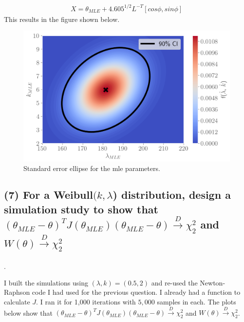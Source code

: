 \documentclass[11pt]{article}
\begin{document}
\begin{align*}
    X = \theta_{MLE} + 4.605^{1/2} L^{-T} [cos \phi, sin\phi]
\end{align*}
This results in the figure shown below.



\begin{figure}[!h]
    \centering
    \includegraphics[scale=.55]{homework_2/figures/weibull_se.png}
    \caption{Standard error ellipse for the mle parameters.}
    \label{fig:my_label}
\end{figure}

\subsection*{(7) For a Weibull$(k,\lambda$) distribution, design a
simulation study to show that \\ $(\theta_{MLE}-\theta)^TJ(\theta_{MLE})(\theta_{MLE}-\theta)\xrightarrow[]{D} \chi^2_2$ and $W(\theta) \xrightarrow[]{D}  \chi^2_2$}.

I built the simulations using $(\lambda, k) = (0.5, 2)$ and re-used the Newton-Raphson code I had used for the previous question. I already had a function to calculate $J$. I ran it for 1,000 iterations with $5,000$ samples in each. The plots below show  that $(\theta_{MLE}-\theta)^TJ(\theta_{MLE})(\theta_{MLE}-\theta)\xrightarrow[]{D} \chi^2_2$ and $W(\theta) \xrightarrow[]{D}  \chi^2_2$.
\end{document}
